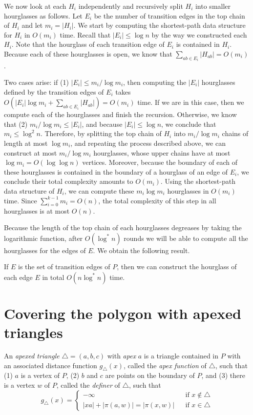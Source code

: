 \documentclass[a4paper,UKenglish]{lipics}
\newcommand{\g}[2]{\ensuremath{|\pi(#1, #2)|}}
\begin{document}
We now look at each $H_i$ independently and recursively split $H_i$ into smaller hourglasses as follows.
Let $E_i$ be the number of transition edges in the top chain of $H_i$ and let $m_i = |H_i|$. 
We start by computing the shortest-path data structure for $H_i$ in $O(m_i)$ time.
Recall that $|E_i| \leq \log n$ by the way we constructed each $H_i$.
Note that the hourglass of each transition edge of $E_i$ is contained in $H_i$. 
Because each of these hourglasses is open, we know that $\sum_{ab\in E_i} |H_{ab}| = O(m_i)$. 

Two cases arise: if (1) $|E_i| \leq m_i / \log m_i$, then computing the $|E_i|$ hourglasses defined by the transition edges of $E_i$ takes $O(|E_i| \log m_i + \sum_{ab\in E_i} |H_{ab}|) = O(m_i)$ time. 
If we are in this case, then we compute each of the hourglasses and finish the recursion.
Otherwise, we know that (2) $m_i / \log m_i\leq |E_i|$, and because $|E_i| \leq \log n$, we conclude that $m_i \leq \log^2 n$.
Therefore, by splitting the top chain of $H_i$ into $m_i/\log m_i$ chains of length at most $\log m_i$, and repeating the process described above, we can construct at most $m_i / \log m_i$ hourglasses, whose upper chains have at most $\log m_i = O(\log \log n)$ vertices. 
Moreover, because the boundary of each of these hourglasses is contained in the boundary of a hourglass of an edge of $E_i$, we conclude their total complexity amounts to $O(m_i)$.
Using the shortest-path data structure of $H_i$, we can compute these $m_i\log m_i$ hourglasses in $O(m_i)$ time.
Since $\sum_{i = 0} ^{k-1} m_i = O(n)$, the total complexity of this step in all hourglasses is at most $O(n)$.

Because the length of the top chain of each hourglasses degreases by taking the logarithmic function, after $O(\log^*n)$ rounds we will be able to compute all the hourglasses for the edges of $E$. We obtain the following result.

\begin{lemma}\label{lemma: Hourglass partition}
If $E$ is the set of transition edges of $P$, then we can construct the hourglass of each edge $E$ in total $O(n \log^* n)$ time.
\end{lemma}

\section{Covering the polygon with apexed triangles}
An \emph{apexed triangle} $\triangle = (a,b,c)$ with \emph{apex} $a$ is a triangle contained in $P$ with an associated distance function $g_\triangle(x)$, called the \emph{apex function} of $\triangle$, such that (1) $a$ is a vertex of $P$, (2) $b$ and $c$ are points on the boundary of $P$, and (3) there is a  vertex $w$ of  $P$, called the \emph{definer} of $\triangle$, such that
$$g_\triangle(x) = \left\{ \begin{array}{lll}
-\infty&&\text{if $x\notin \triangle$}\\
|xa| + \g{a}{w} = \g{x}{w} && \text{if $x\in \triangle$}
\end{array}\right.$$
\end{document}
